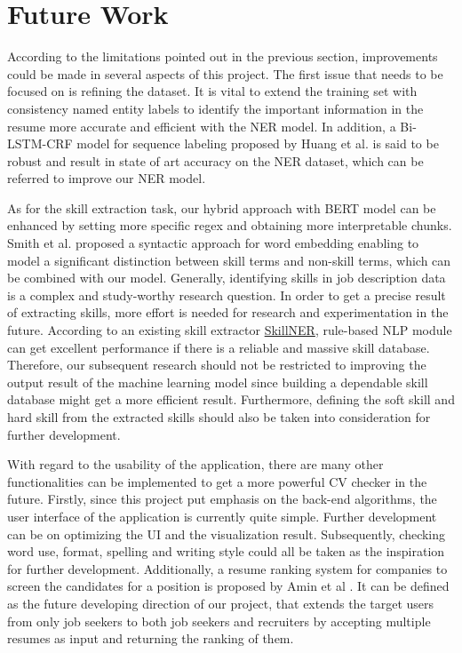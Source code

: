 \section{Future Work}

According to the limitations pointed out in the previous section, improvements could be made in several aspects of this project. The first issue that needs to be focused on is refining the dataset. It is vital to extend the training set with consistency named entity labels to identify the important information in the resume more accurate and efficient with the NER model. In addition, a Bi-LSTM-CRF model for sequence labeling proposed by Huang et al. \cite{huang2015bidirectional} is said to be robust and result in state of art accuracy on the NER dataset, which can be referred to improve our NER model. 

As for the skill extraction task, our hybrid approach with BERT model can be enhanced by setting more specific regex and obtaining more interpretable chunks. Smith et al. \cite{smith2021skill} proposed a syntactic approach for word embedding enabling to model a significant distinction between skill terms and non-skill terms, which can be combined with our model. Generally, identifying skills in job description data is a complex and study-worthy research question. In order to get a precise result of extracting skills, more effort is needed for research and experimentation in the future. According to an existing skill extractor \href{https://github.com/AnasAito/SkillNER}{SkillNER}\cite{skillner}, rule-based NLP module can get excellent performance if there is a reliable and massive skill database. Therefore, our subsequent research should not be restricted to improving the output result of the machine learning model since building a dependable skill database might get a more efficient result. Furthermore, defining the soft skill and hard skill from the extracted skills should also be taken into consideration for further development. 

With regard to the usability of the application, there are many other functionalities can be implemented to get a more powerful CV checker in the future. Firstly, since this project put emphasis on the back-end algorithms, the user interface of the application is currently quite simple. Further development can be on optimizing the UI and the visualization result. Subsequently, checking word use, format, spelling and writing style could all be taken as the inspiration for further development. Additionally, a resume ranking system for companies to screen the candidates for a position is proposed by Amin et al \cite{amin2019web}. It can be defined as the future developing direction of our project, that extends the target users from only job seekers to both job seekers and recruiters by accepting multiple resumes as input and returning the ranking of them.






